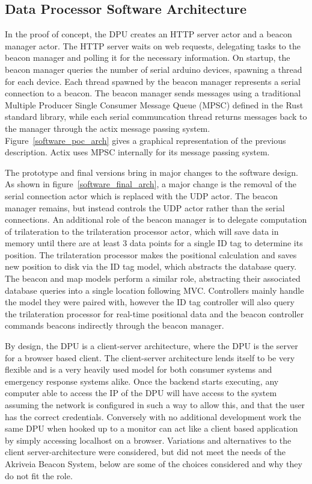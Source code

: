 \subsection{Data Processor Software Architecture}
\medskip
In the proof of concept, the DPU creates an HTTP server actor and a beacon manager actor.
The HTTP server waits on web requests, delegating tasks to the beacon manager and polling it for the necessary information.
On startup, the beacon manager queries the number of serial arduino devices, spawning a thread for each device.
Each thread spawned by the beacon manager represents a serial connection to a beacon.
The beacon manager sends messages using a traditional Multiple Producer Single Consumer Message Queue (\Gls{MPSC}) defined in the Rust standard library, while each serial communcation thread returns messages back to the manager through the actix message passing system.
Figure~\ref{software_poc_arch} gives a graphical representation of the previous description.
Actix uses MPSC internally for its message passing system.

\bigskip
The prototype and final versions bring in major changes to the software design.
As shown in figure~\ref{software_final_arch}, a major change is the removal of the serial connection actor which is replaced with the UDP actor.
The beacon manager remains, but instead controls the UDP actor rather than the serial connections.
An additional role of the beacon manager is to delegate computation of trilateration to the trilateration processor actor, which will save data in memory until there are at least 3 data points for a single ID tag to determine its position.
The trilateration processor makes the positional calculation and saves new position to disk via the ID tag model, which abstracts the database query.
The beacon and map models perform a similar role, abstracting their associated database queries into a single location following \Gls{MVC}.
Controllers mainly handle the model they were paired with, however the ID tag controller will also query the trilateration processor for real-time positional data and the beacon controller commands beacons indirectly through the beacon manager.

\bigskip
By design, the DPU is a client-server architecture, where the DPU is the server for a browser based client.
The client-server architecture lends itself to be very flexible and is a very heavily used model for both consumer systems and emergency response systems alike.
Once the backend starts executing, any computer able to access the IP of the DPU will have access to the system assuming the network is configured in such a way to allow this, and that the user has the correct credentials.
Conversely with no additional development work the same DPU when hooked up to a monitor can act like a client based application by simply accessing localhost on a browser.
Variations and alternatives to the client server-architecture were considered, but did not meet the needs of the Akriveia Beacon System, below are some of the choices considered and why they do not fit the role.

